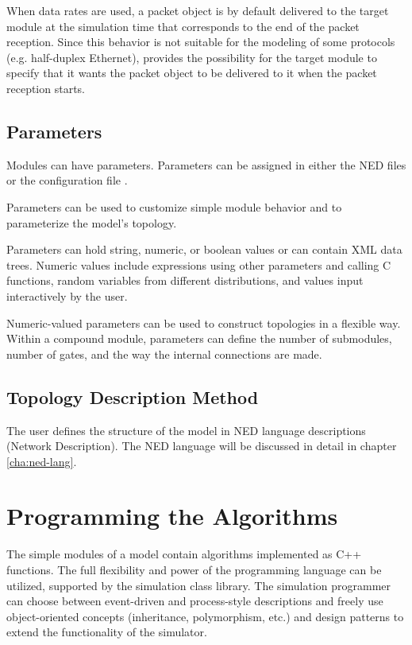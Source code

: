 When data rates are used, a packet object is by default delivered to the
target module at the simulation time that corresponds to the end of the
packet reception. Since this behavior is not suitable for the modeling of
some protocols (e.g. half-duplex Ethernet), {\opp} provides the
possibility for the target module to specify that it wants the packet object
to be delivered to it when the packet reception starts.


\subsection{Parameters}
\label{sec:overview:parameters}

Modules can have parameters. Parameters can be assigned in either
the NED files or the configuration file .

Parameters can be used to customize simple module behavior
and to parameterize the model's topology.

Parameters can hold string, numeric, or boolean
values or can
contain XML data trees. Numeric values include expressions using
other parameters and calling C functions, random variables from
different distributions, and values input interactively by the user.

Numeric-valued parameters can be used to construct topologies in a
flexible way. Within a compound module, parameters can define the
number of submodules, number of gates, and the way the internal
connections are made.


\subsection{Topology Description Method}
\label{sec:overview:topology-description-method}

The user defines the structure of the model in NED language descriptions
(Network Description). The NED language will be discussed in detail
in chapter \ref{cha:ned-lang}.


\section{Programming the Algorithms}
\label{sec:overview:programmable-using-cplusplus}

The simple modules of a model contain algorithms
implemented as C++ functions.
The full flexibility and power of the programming language can
be utilized, supported by the {\opp} simulation class library.
The simulation programmer can choose between event-driven and process-style
descriptions and freely use object-oriented concepts
(inheritance, polymorphism, etc.) and design patterns to extend the
functionality of the simulator.

